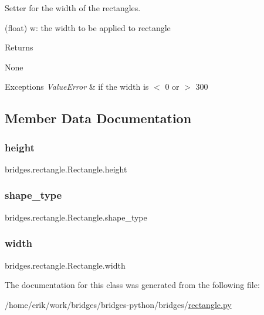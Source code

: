 Setter for the width of the rectangles. 

(float) w\+: the width to be applied to rectangle \begin{DoxyReturn}{Returns}


None
\end{DoxyReturn}

\begin{DoxyExceptions}{Exceptions}
{\em Value\+Error} & if the width is $<$ 0 or $>$ 300 \\
\hline
\end{DoxyExceptions}


\subsection{Member Data Documentation}
\mbox{\label{classbridges_1_1rectangle_1_1_rectangle_a3b7a2448881d5eea95e86aac8dfae467}} 
\subsubsection{\texorpdfstring{height}{height}}
{\footnotesize\ttfamily bridges.\+rectangle.\+Rectangle.\+height}

\mbox{\label{classbridges_1_1rectangle_1_1_rectangle_acd8a51dab1da86bd859fb47fb7ab1884}} 
\subsubsection{\texorpdfstring{shape\+\_\+type}{shape\_type}}
{\footnotesize\ttfamily bridges.\+rectangle.\+Rectangle.\+shape\+\_\+type}

\mbox{\label{classbridges_1_1rectangle_1_1_rectangle_ac70360e861fb0dfab5fae8525ffc86ba}} 
\subsubsection{\texorpdfstring{width}{width}}
{\footnotesize\ttfamily bridges.\+rectangle.\+Rectangle.\+width}



The documentation for this class was generated from the following file\+:\begin{DoxyCompactItemize}
\item 
/home/erik/work/bridges/bridges-\/python/bridges/\hyperlink{rectangle_8py}{rectangle.\+py}\end{DoxyCompactItemize}

